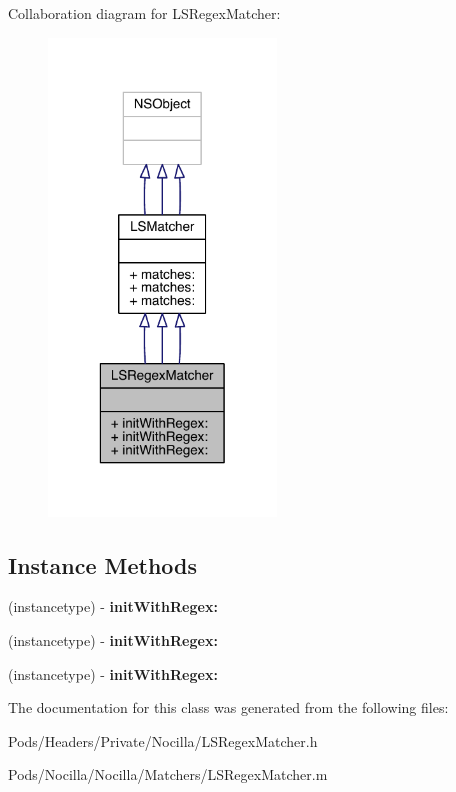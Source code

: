 Collaboration diagram for L\-S\-Regex\-Matcher\-:\nopagebreak
\begin{figure}[H]
\begin{center}
\leavevmode
\includegraphics[width=172pt]{interface_l_s_regex_matcher__coll__graph}
\end{center}
\end{figure}
\subsection*{Instance Methods}
\begin{DoxyCompactItemize}
\item 
\hypertarget{interface_l_s_regex_matcher_aa8b5a7a15d0b389f068fa21f7bb766f9}{(instancetype) -\/ {\bfseries init\-With\-Regex\-:}}\label{interface_l_s_regex_matcher_aa8b5a7a15d0b389f068fa21f7bb766f9}

\item 
\hypertarget{interface_l_s_regex_matcher_aa8b5a7a15d0b389f068fa21f7bb766f9}{(instancetype) -\/ {\bfseries init\-With\-Regex\-:}}\label{interface_l_s_regex_matcher_aa8b5a7a15d0b389f068fa21f7bb766f9}

\item 
\hypertarget{interface_l_s_regex_matcher_aa8b5a7a15d0b389f068fa21f7bb766f9}{(instancetype) -\/ {\bfseries init\-With\-Regex\-:}}\label{interface_l_s_regex_matcher_aa8b5a7a15d0b389f068fa21f7bb766f9}

\end{DoxyCompactItemize}


The documentation for this class was generated from the following files\-:\begin{DoxyCompactItemize}
\item 
Pods/\-Headers/\-Private/\-Nocilla/L\-S\-Regex\-Matcher.\-h\item 
Pods/\-Nocilla/\-Nocilla/\-Matchers/L\-S\-Regex\-Matcher.\-m\end{DoxyCompactItemize}
